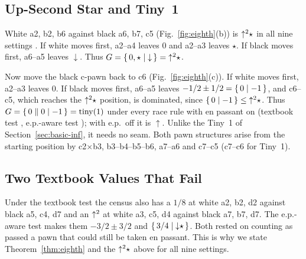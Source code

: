 \subsection{Up-Second Star and Tiny~1}
White a2, b2, b6 against black a6, b7, c5 (Fig.~\ref{fig:eighth}(b)) is $\mathord{\uparrow^{2}}\star$ in all nine settings
. If white moves first, a2--a4 leaves $0$ and a2--a3 leaves $\star$. If black moves first, a6--a5
leaves ${\downarrow}$. Thus $G=\{\,0,\star \mid {\downarrow}\,\}=\mathord{\uparrow^{2}}\star$.

Now move the black c-pawn back to c6 (Fig.~\ref{fig:eighth}(c)). If white moves first, a2--a3 leaves $0$.
If black moves first, a6--a5 leaves $-1/2\pm1/2=\{\,0 \mid -1\,\}$, and c6--c5, which reaches the $\mathord{\uparrow^{2}}\star$
position, is dominated, since $\{\,0 \mid -1\,\}\le\mathord{\uparrow^{2}}\star$. Thus $G=\{\,0 \parallel 0\mid -1\,\}=\operatorname{tiny}(1)$ under
every race rule with en passant on (textbook test , e.p.-aware test ); with e.p.\ off it is
${\uparrow}$. Unlike the Tiny~1 of Section~\ref{sec:basic-inf}, it needs no seam. Both pawn structures
arise from the starting position by c2$\times$b3, b3--b4--b5--b6, a7--a6 and c7--c5 (c7--c6 for Tiny~1).

\subsection{Two Textbook Values That Fail}
Under the textbook test the census also has a $1/8$ at white a2, b2, d2 against black a5, c4, d7 and an
$\mathord{\uparrow^{2}}$ at white a3, c5, d4 against black a7, b7, d7. The e.p.-aware test makes them $-3/2\pm3/2$ and
$\{\,3/4 \mid {\downarrow}\star\,\}$. Both rested on counting as passed a pawn that
could still be taken en passant. This is why we state Theorem~\ref{thm:eighth} and the $\mathord{\uparrow^{2}}\star$ above for
all nine settings.
